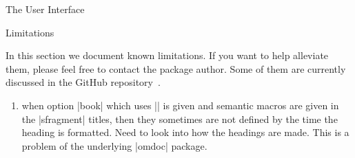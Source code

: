\begin{sfragment}[id=sec:user]{The User Interface}
\begin{sfragment}[id=sec:limitations]{Limitations}

In this section we document known limitations. If you want to help alleviate them,
please feel free to contact the package author. Some of them are currently discussed in
the \sTeX GitHub repository~\cite{sTeX:github:on}. 
\begin{enumerate}
\item when option |book| which uses |\pagestyle{headings}| is given and semantic macros
  are given in the |sfragment| titles, then they sometimes are not defined by the time the
  heading is formatted. Need to look into how the headings are made. This is a problem
  of the underlying |omdoc| package.
\end{enumerate}
\end{sfragment}
\end{sfragment}

